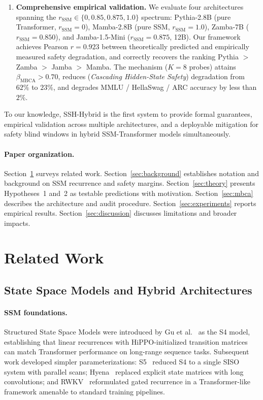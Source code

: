 \documentclass{article}
\newcommand{\rSSM}{r_{\mathrm{SSM}}}
\newcommand{\MBCA}{\mathrm{MBCA}}
\newcommand{\CHSS}{\mathrm{CHSS}}
\newcommand{\betaMBCA}{\beta_{\MBCA}}
\begin{document}
\begin{enumerate}[label=(\roman*), leftmargin=*, itemsep=2pt]
  \item \textbf{Comprehensive empirical validation.}  We evaluate four
    architectures spanning the $\rSSM \in \{0, 0.85, 0.875, 1.0\}$ spectrum:
    Pythia-2.8B (pure Transformer, $\rSSM = 0$), Mamba-2.8B (pure SSM,
    $\rSSM = 1.0$), Zamba-7B ($\rSSM = 0.850$), and Jamba-1.5-Mini ($\rSSM =
    0.875$, 12B).  Our framework achieves Pearson $r = 0.923$ between
    theoretically predicted and empirically measured safety degradation, and
    correctly recovers the ranking Pythia $>$ Zamba $>$ Jamba $>$ Mamba.  The
    \MBCA{} mechanism ($K = 8$ probes) attains $\betaMBCA > 0.70$, reduces
    \CHSS{} (\emph{Cascading Hidden-State Safety}) degradation from $62\%$ to
    $23\%$, and degrades MMLU / HellaSwag / ARC accuracy by less than $2\%$.

\end{enumerate}

To our knowledge, SSH-Hybrid is the first system to provide formal guarantees,
empirical validation across multiple architectures, and a deployable mitigation
for safety blind windows in hybrid SSM-Transformer models simultaneously.

\paragraph{Paper organization.}
Section~\ref{sec:related} surveys related work.
Section~\ref{sec:background} establishes notation and background on SSM
recurrence and safety margins.
Section~\ref{sec:theory} presents Hypotheses~1 and~2 as testable predictions with motivation.
Section~\ref{sec:mbca} describes the \MBCA{} architecture and audit procedure.
Section~\ref{sec:experiments} reports empirical results.
Section~\ref{sec:discussion} discusses limitations and broader impacts.

\section{Related Work}
\label{sec:related}

\subsection{State Space Models and Hybrid Architectures}

\paragraph{SSM foundations.}
Structured State Space Models were introduced by Gu et al.~\cite{gu2022efficiently}
as the S4 model, establishing that linear recurrences with HiPPO-initialized
transition matrices can match Transformer performance on long-range sequence
tasks.  Subsequent work developed simpler parameterizations: S5~\cite{smith2022s5}
reduced S4 to a single SISO system with parallel scans; Hyena~\cite{poli2023hyena}
replaced explicit state matrices with long convolutions; and
RWKV~\cite{peng2023rwkv} reformulated gated recurrence in a Transformer-like
framework amenable to standard training pipelines.
\end{document}
